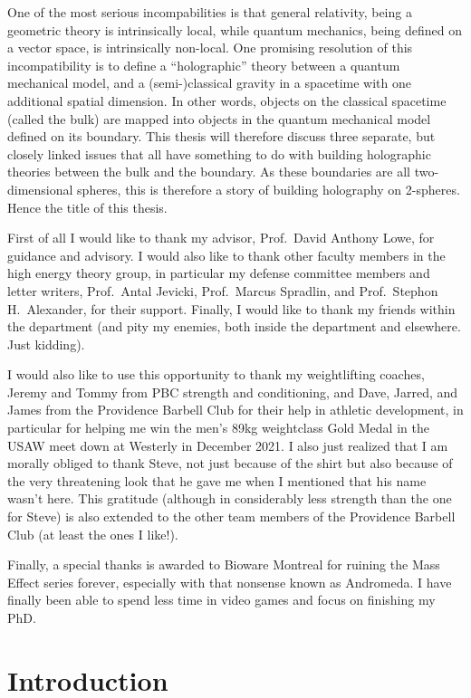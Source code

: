 \documentclass{brownthesis}
\begin{document}
One of the most serious incompabilities is that general relativity, being a geometric theory is intrinsically local, while quantum mechanics, being defined on a vector space, is intrinsically non-local. One promising resolution of this incompatibility is to define a ``holographic'' theory between a quantum mechanical model, and a (semi-)classical gravity in a spacetime with one additional spatial dimension. In other words, objects on the classical spacetime (called the bulk) are mapped into objects in the quantum mechanical model defined on its boundary. This thesis will therefore discuss three separate, but closely linked issues that all have something to do with building holographic theories between the bulk and the boundary. As these boundaries are all two-dimensional spheres, this is therefore a story of building holography on 2-spheres. Hence the title of this thesis.

First of all I would like to thank my advisor, Prof.~David Anthony Lowe, for guidance and advisory. I would also like to thank other faculty members in the high energy theory group, in particular my defense committee members and letter writers, Prof.~Antal Jevicki, Prof.~Marcus Spradlin, and Prof.~Stephon H.~Alexander, for their support. Finally, I would like to thank my friends within the department (and pity my enemies, both inside the department and elsewhere. Just kidding).

I would also like to use this opportunity to thank my weightlifting coaches, Jeremy and Tommy from PBC strength and conditioning, and Dave, Jarred, and James from the Providence Barbell Club for their help in athletic development, in particular for helping me win the men's 89kg weightclass Gold Medal in the USAW meet down at Westerly in December 2021. I also just realized that I am morally obliged to thank Steve, not just because of the shirt but also because of the very threatening look that he gave me when I mentioned that his name wasn't here. This gratitude (although in considerably less strength than the one for Steve) is also extended to the other team members of the Providence Barbell Club (at least the ones I like!).

Finally, a special thanks is awarded to Bioware Montreal for ruining the Mass Effect series forever, especially with that nonsense known as Andromeda. I have finally been able to spend less time in video games and focus on finishing my PhD.
\afterpreface

\chapter{Introduction}
\end{document}
